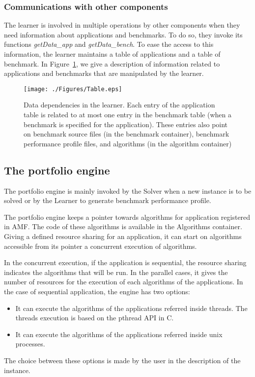 \subsubsection{Communications with other components}

The learner is involved in multiple operations by other components when they need information 
about applications and benchmarks. To do so, they invoke its functions \textit{getData\_app} and  \textit{getData\_bench}. 
To ease the access to this information, the learner maintains a 
table of applications and a table of benchmark. In Figure~\ref{Dependencies2}, we give a description of information related to applications and benchmarks that are manipulated by the learner.


\begin{figure}[!htbp]
\begin{center}
\texttt{[image: ./Figures/Table.eps]}
\caption{Data dependencies in the learner. Each entry of the application table is related to 
at most one entry in the benchmark table (when a benchmark is specified for the application). 
These entries also point on benchmark source files (in the benchmark container), benchmark performance profile files, and 
algorithms  (in the algorithm container)}
 \label{Dependencies2}
\end{center}
\end{figure}

\subsection{The portfolio engine}

The portfolio engine is mainly invoked by the Solver when a new instance is to be solved or by the 
Learner to generate benchmark performance profile. 

The portfolio engine keeps a pointer towards algorithms for application registered in 
AMF. The code of these algorithms is available in the Algorithms container. Giving a defined 
resource sharing for an application, it can start on algorithms accessible from its pointer a concurrent 
execution of algorithms.

In the concurrent execution, if the application is sequential, the resource sharing indicates 
the algorithms that will be run. In the parallel cases, it gives the number of resources for the execution 
of each algorithms of the applications. 
In the case of sequential application, the engine has two options:
\begin{itemize}
\item It can execute the algorithms of the applications referred inside threads. The threads 
execution is based on the pthread API in C.
\item It can execute the algorithms of the applications referred inside unix processes. 
\end{itemize}
The choice between these options is made by the user in the description of the instance.

